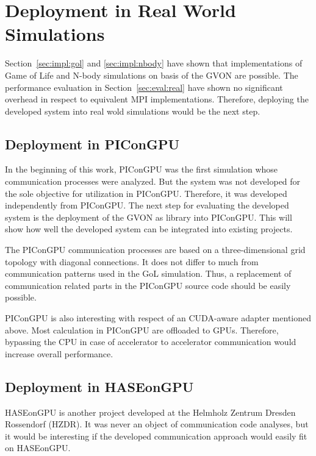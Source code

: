\section*{Deployment in Real World Simulations}

Section~\ref{sec:impl:gol} and \ref{sec:impl:nbody} have shown that
implementations of Game of Life and N-body simulations on basis of the
GVON are possible. The performance evaluation in
Section~\ref{sec:eval:real} have shown no significant overhead in
respect to equivalent MPI implementations. Therefore, deploying the
developed system into real wold simulations would be the next step.

\subsection*{Deployment in PIConGPU}
In the beginning of this work, PIConGPU was the first simulation whose
communication processes were analyzed. But the system was not
developed for the sole objective for utilization in
PIConGPU. Therefore, it was developed independently from PIConGPU.
The next step for evaluating the developed system is the deployment of
the GVON as library into PIConGPU. This will show how well the
developed system can be integrated into existing projects.

The PIConGPU communication processes are based on a three-dimensional
grid topology with diagonal connections. It does not differ to much
from communication patterns used in the GoL simulation. Thus, a
replacement of communication related parts in the PIConGPU source code
should be easily possible.

PIConGPU is also interesting with respect of an CUDA-aware adapter
mentioned above.  Most calculation in PIConGPU are offloaded to
GPUs. Therefore, bypassing the CPU in case of accelerator to
accelerator communication would increase overall performance.

\subsection*{Deployment in HASEonGPU}
HASEonGPU is another project developed at the Helmholz Zentrum
Dresden Rossendorf (HZDR).  It was never an object of communication code
analyses, but it would be interesting if the developed communication
approach would easily fit on HASEonGPU.

